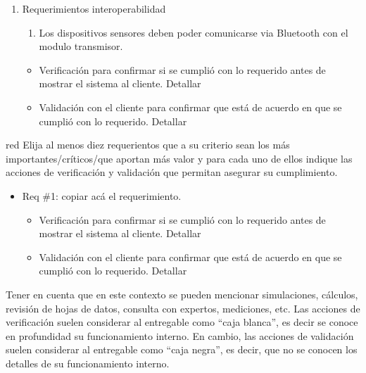 \documentclass[
11pt, %
]{charter}
\begin{document}
\begin{enumerate}
	\item Requerimientos interoperabilidad
	\begin{enumerate}
		\item Los dispositivos sensores deben poder comunicarse via Bluetooth con el modulo transmisor.
		
	\end{enumerate}
		\begin{itemize}
			\item Verificación para confirmar si se cumplió con lo requerido antes de mostrar el sistema al cliente. Detallar 
			\item Validación con el cliente para confirmar que está de acuerdo en que se cumplió con lo requerido. Detallar  
			\end{itemize}
	
\end{enumerate}

\begin{consigna}{red}
Elija al menos diez requerientos que a su criterio sean los más importantes/críticos/que aportan más valor y para cada uno de ellos indique las acciones de verificación y validación que permitan asegurar su cumplimiento.

\begin{itemize} 
\item Req \#1: copiar acá el requerimiento.

\begin{itemize}
	\item Verificación para confirmar si se cumplió con lo requerido antes de mostrar el sistema al cliente. Detallar 
	\item Validación con el cliente para confirmar que está de acuerdo en que se cumplió con lo requerido. Detallar  
\end{itemize}

\end{itemize}

Tener en cuenta que en este contexto se pueden mencionar simulaciones, cálculos, revisión de hojas de datos, consulta con expertos, mediciones, etc.  Las acciones de verificación suelen considerar al entregable como ``caja blanca'', es decir se conoce en profundidad su funcionamiento interno.  En cambio, las acciones de validación suelen considerar al entregable como ``caja negra'', es decir, que no se conocen los detalles de su funcionamiento interno.

\end{consigna}
\end{document}
